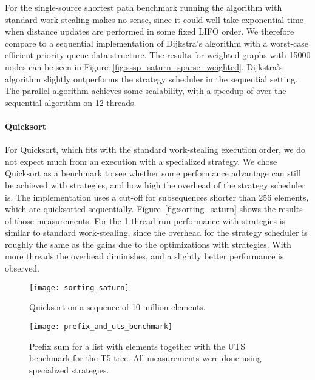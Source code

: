\documentclass[a4paper,11pt]{article}
\begin{document}
For the single-source shortest path benchmark running the algorithm
with standard work-stealing makes no sense, since it could well take
exponential time when distance updates are performed in some fixed
LIFO order.  We therefore compare to a sequential implementation of
Dijkstra's algorithm with a worst-case efficient priority queue data
structure. The results for weighted graphs with 15000 nodes can be
seen in Figure~\ref{fig:sssp_saturn_sparse_weighted}. Dijkstra's
algorithm slightly outperforms the strategy scheduler in the
sequential setting. The parallel algorithm achieves some scalability,
with a speedup of  over the sequential algorithm on 12 threads.

\paragraph{Quicksort}

For Quicksort, which fits with the standard work-stealing execution
order, we do not expect much from an execution with a specialized
strategy. We chose Quicksort as a benchmark to see whether some
performance advantage can still be achieved with strategies, and how
high the overhead of the strategy scheduler is. The implementation
uses a cut-off for subsequences shorter than 256 elements, which are
quicksorted sequentially. Figure~\ref{fig:sorting_saturn} shows the
results of those measurements. For the 1-thread run performance with
strategies is similar to standard work-stealing, since the overhead
for the strategy scheduler is roughly the same as the gains due to the
optimizations with strategies. With more threads the overhead
diminishes, and a slightly better performance is observed.

\begin{figure}
\centering
\begin{minipage}[t]{0.45\textwidth}
\texttt{[image: sorting\_saturn]}
\caption{Quicksort on a sequence of 10 million elements.}
\label{fig:sorting_saturn}
\end{minipage}
\hspace{0.05\textwidth}
\begin{minipage}[t]{0.45\textwidth}
\texttt{[image: prefix\_and\_uts\_benchmark]}
\caption{Prefix sum for a list with  elements together with the UTS benchmark for the T5 tree. All measurements were done using specialized strategies.}
\label{fig:prefix_and_uts_benchmark}
\end{minipage}
\end{figure}
\end{document}

